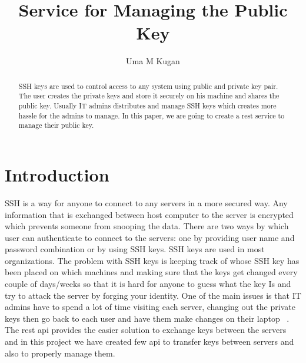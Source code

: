 
\title{Service for Managing the Public Key}

\author{Uma M Kugan}

\renewcommand{\shortauthors}{Uma Kugan}
\begin{abstract}
SSH keys are used to control access to any system using public and private
key pair. The user creates the private keys and store it securely on his 
machine and shares the public key. Usually IT admins distributes and
manage SSH keys which creates more hassle for the admins to manage.
In this paper, we are going to create a rest service to manage their
public key.

\end{abstract}



\maketitle

\section{Introduction}
SSH is a way for anyone to connect to any servers in a more secured way. 
Any information that is exchanged between host computer to the server is
encrypted which prevents someone from snooping the data. There are two
ways by which user can authenticate to connect to the servers: one by
providing user name and password combination or by using SSH keys.
SSH keys are used in most organizations. The problem with SSH keys is keeping 
track of whose SSH key has been placed on which machines and making sure that 
the keys get changed every couple of days/weeks so that it is hard for anyone 
to guess what the key Is and try to attack the server by forging your 
identity. One of the main issues is that IT admins have to spend a lot of 
time visiting each server, changing out the private keys then go back to each
user and have them make changes on their laptop
~\cite{hid-sp18-513-ylonen2013user}. 
The rest api provides the easier solution to exchange keys between the servers
and in this project we have created few api to transfer keys between servers
and also to properly manage them.

